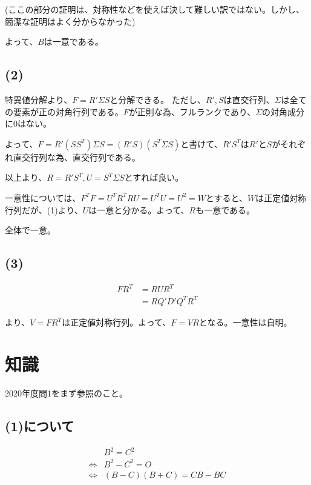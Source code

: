 \documentclass[a4paper, 10pt, dvipdfmx]{jlreq}
\begin{document}
(ここの部分の証明は、対称性などを使えば決して難しい訳ではない。しかし、簡潔な証明はよく分からなかった)

よって、$B$は一意である。

\subsection*{(2)}

特異値分解より、$F=R' \Sigma S$と分解できる。
ただし、$R',S$は直交行列、$\Sigma$は全ての要素が正の対角行列である。$F$が正則な為、フルランクであり、$\Sigma$の対角成分に0はない。

よって、$F=R' (SS^T) \Sigma S=(R'S)(S^T\Sigma S) $と書けて、$R' S^T$は$R'$と$S$がそれぞれ直交行列な為、直交行列である。

以上より、$R=R' S^T,U=S^T \Sigma S$とすれば良い。

一意性については、$F^TF=U^TR^TRU=U^TU=U^2=W$とすると、$W$は正定値対称行列だが、(1)より、$U$は一意と分かる。よって、$R$も一意である。

全体で一意。

\subsection*{(3)}

\begin{align*}
  FR^T & =RUR^T       \\
       & =RQ'D'Q^TR^T
\end{align*}

より、$V=FR^T$は正定値対称行列。よって、$F=VR$となる。一意性は自明。

\section{知識}

2020年度問1をまず参照のこと。

\subsection*{(1)について}

\begin{align*}
                  & B^2         =C^2    \\
  \Leftrightarrow & B^2-C^2     =O      \\
  \Leftrightarrow & (B-C)(B+C)  = CB-BC \\
\end{align*}
\end{document}
